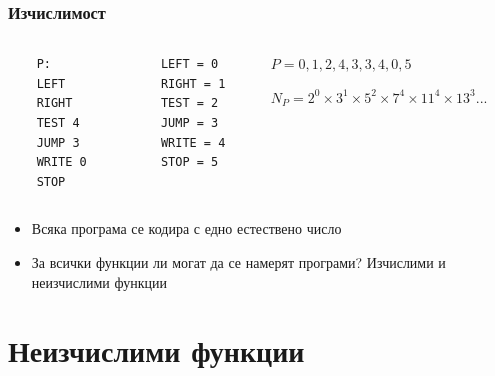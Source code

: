 \documentclass{beamer}
\begin{document}
\begin{frame}[fragile]
\frametitle{Изчислимост}





\begin{columns}[t]
  \begin{column}{0.2\textwidth}
    \begin{flushleft}
    \begin{verbatim}
    P:
    LEFT
    RIGHT
    TEST 4
    JUMP 3
    WRITE 0
    STOP
    \end{verbatim}
    \end{flushleft}
  \end{column}
  \begin{column}{0.2\textwidth}
    \begin{flushleft}
    \begin{verbatim}
    LEFT = 0
    RIGHT = 1
    TEST = 2
    JUMP = 3
    WRITE = 4
    STOP = 5
    \end{verbatim}

    \end{flushleft}

  \end{column}

  \begin{column}{0.6\textwidth}
    \begin{flushleft}
    $P = 0, 1, 2, 4, 3, 3, 4, 0, 5$

    $N_P=2^0 \times 3^1 \times 5^2 \times 7^4 \times 11^4 \times 13^ 3 ...$

    \end{flushleft}

  \end{column}


\end{columns}


  \begin{itemize}
    \item Всяка програма се кодира с едно естествено число
    \item За всички функции ли могат да се намерят програми? Изчислими и неизчислими функции
  \end{itemize}


\end{frame}

\section{Неизчислими функции}
\end{document}
